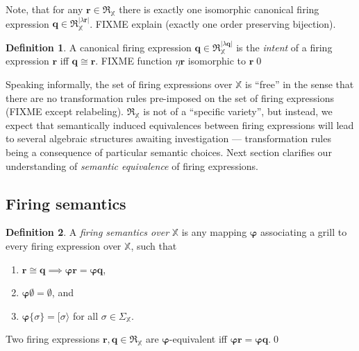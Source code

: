 \documentclass [a4paper,12pt] {article}
\theoremstyle{definition}
\newtheorem{definition}{Definition}[section]
\begin{document}
Note, that for any $\bm{r} \in \mathfrak{R}_{\mathbb X}$ there is
exactly one isomorphic canonical firing expression $\bm{q} \in
\mathfrak{R}_{\mathbb X}^{|\lambda\bm{r}|}$.  FIXME explain (exactly
one order preserving bijection).

\begin {definition}\label{def-intent}
  A canonical firing expression $\bm{q} \in \mathfrak{R}_{\mathbb
    X}^{|\lambda\bm{q}|}$ is the {\em intent}\/ of a firing expression
  $\bm{r}$ iff $\bm{q} \cong \bm{r}$. FIXME function $\eta\bm{r}$
  isomorphic to $\bm{r}$\qed
\end {definition}

Speaking informally, the set of firing expressions over ${\mathbb X}$
is ``free'' in the sense that there are no transformation rules
pre-imposed on the set of firing expressions (FIXME except
relabeling).  $\mathfrak{R}_{\mathbb X}$ is not of a ``specific
variety'', but instead, we expect that semantically induced
equivalences between firing expressions will lead to several algebraic
structures awaiting investigation --- transformation rules being a
consequence of particular semantic choices.  Next section clarifies
our understanding of {\em semantic equivalence}\/ of firing
expressions.

\subsection {Firing semantics}

\begin {definition}\label{def-semantics}
  A {\em firing semantics over}\/ ${\mathbb X}$ is any mapping
  $\bm{\varphi}$ associating a grill to every firing expression over
  ${\mathbb X}$, such that
  \begin {enumerate}
  \item $\bm{r} \cong \bm{q} \implies \bm{\varphi}\bm{r} =
    \bm{\varphi}\bm{q}$,
  \item $\bm{\varphi}\emptyset = \emptyset$, and
  \item $\bm{\varphi}\{\sigma\} = [\sigma\rangle$ for all $\sigma \in
    \Sigma_{\mathbb X}$.
  \end {enumerate}
  Two firing expressions $\bm{r}, \bm{q} \in \mathfrak{R}_{\mathbb X}$
  are $\bm{\varphi}$-equivalent iff $\bm{\varphi}\bm{r} =
  \bm{\varphi}\bm{q}$.\qed
\end {definition}
\end{document}
